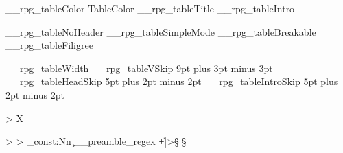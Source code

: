 \ExplSyntaxOn
{}
{
		{\__rpg_tableColor}	{TableColor}
		{\__rpg_tableTitle}	{}
		{\__rpg_tableIntro}	{}

		{\__rpg_tableNoHeader}
		{\__rpg_tableSimpleMode}
		{\__rpg_tableBreakable}
		{\__rpg_tableFiligree}

		{\__rpg_tableWidth}	{\linewidth}
		{\__rpg_tableVSkip} {9pt plus 3pt minus 3pt}
		{\__rpg_tableHeadSkip} {5pt plus 2pt minus 2pt}
		{\__rpg_tableIntroSkip} {5pt plus 2pt minus 2pt}
}

\newcolumntype {Y} { > {\centering\arraybackslash } X } %

\newcolumntype {`} { > {\global\let\currentRpgRowStyle\relax } }
\newcolumntype {^} { > {\currentRpgRowStyle} }
\newcommand{\RpgRowStyle}[1]
{
	\gdef\currentRpgRowStyle{#1}#1\ignorespaces
}
\regex_const:Nn \c__preamble_regex {\|+|>\s*\S|\S}



